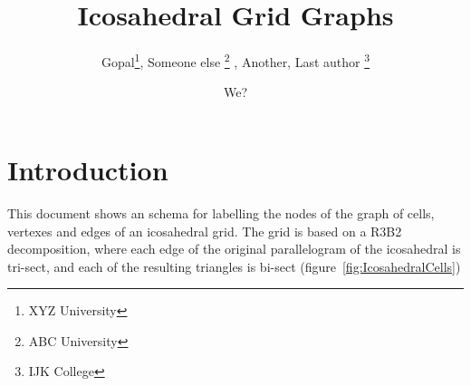 \documentclass{book}
\begin{document}
%
\title{Icosahedral Grid Graphs}


\author{
Gopal\footnote{XYZ University}\setcounter{savecntr}{\value{footnote}},
Someone else \footnote{ABC University} ,
Another\footnotemark[\value{savecntr}],
Last author \footnote{IJK College}
}

\author{
We?}


\maketitle

\begin{versionhistory}
\end{versionhistory}

\tableofcontents



\section{Introduction}

This document shows an schema for labelling the nodes of the graph of cells, vertexes and edges of an icosahedral grid.
The grid is based on a R3B2 decomposition, where each edge of the original parallelogram of the icosahedral is tri-sect, and each of the resulting 
triangles is bi-sect (figure~\ref{fig:IcosahedralCells}) 
\end{document}
